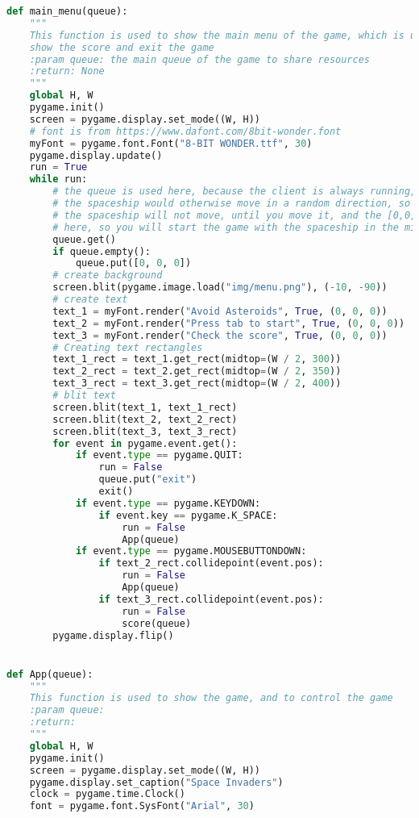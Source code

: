 \documentclass[12pt]{report}			%
\begin{document}
\begin{appendices}
\begin{lstlisting}[title={Program hra.py}, caption={hra.py},  label={lst:hra}, language=Python]
def main_menu(queue):
    """
    This function is used to show the main menu of the game, which is used to start the game,
    show the score and exit the game
    :param queue: the main queue of the game to share resources
    :return: None
    """
    global H, W
    pygame.init()
    screen = pygame.display.set_mode((W, H))
    # font is from https://www.dafont.com/8bit-wonder.font
    myFont = pygame.font.Font("8-BIT WONDER.ttf", 30)
    pygame.display.update()
    run = True
    while run:
        # the queue is used here, because the client is always running, so if you restart the game,
        # the spaceship would otherwise move in a random direction, so if you empty the queue,
        # the spaceship will not move, until you move it, and the [0,0,0] is
        # here, so you will start the game with the spaceship in the middle of the screen
        queue.get()
        if queue.empty():
            queue.put([0, 0, 0])
        # create background
        screen.blit(pygame.image.load("img/menu.png"), (-10, -90))
        # create text
        text_1 = myFont.render("Avoid Asteroids", True, (0, 0, 0))
        text_2 = myFont.render("Press tab to start", True, (0, 0, 0))
        text_3 = myFont.render("Check the score", True, (0, 0, 0))
        # Creating text rectangles
        text_1_rect = text_1.get_rect(midtop=(W / 2, 300))
        text_2_rect = text_2.get_rect(midtop=(W / 2, 350))
        text_3_rect = text_3.get_rect(midtop=(W / 2, 400))
        # blit text
        screen.blit(text_1, text_1_rect)
        screen.blit(text_2, text_2_rect)
        screen.blit(text_3, text_3_rect)
        for event in pygame.event.get():
            if event.type == pygame.QUIT:
                run = False
                queue.put("exit")
                exit()
            if event.type == pygame.KEYDOWN:
                if event.key == pygame.K_SPACE:
                    run = False
                    App(queue)
            if event.type == pygame.MOUSEBUTTONDOWN:
                if text_2_rect.collidepoint(event.pos):
                    run = False
                    App(queue)
                if text_3_rect.collidepoint(event.pos):
                    run = False
                    score(queue)
        pygame.display.flip()


def App(queue):
    """
    This function is used to show the game, and to control the game
    :param queue:
    :return:
    """
    global H, W
    pygame.init()
    screen = pygame.display.set_mode((W, H))
    pygame.display.set_caption("Space Invaders")
    clock = pygame.time.Clock()
    font = pygame.font.SysFont("Arial", 30)


\end{lstlisting}
\end{appendices}
\end{document}
